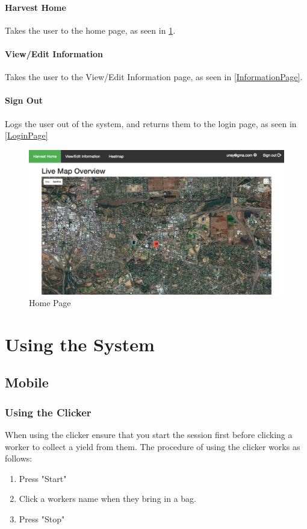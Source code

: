 \documentclass[11pt]{article}
\begin{document}
\paragraph{Harvest Home}Takes the user to the home page, as seen in \ref{HomePage}.
\paragraph{View/Edit Information}Takes the user to the View/Edit Information page, as seen in \ref{InformationPage}.
\paragraph{Sign Out}Logs the user out of the system, and returns them to the login page, as seen in \ref{LoginPage}

\begin{figure}
 \centering
 \includegraphics[width=12cm, keepaspectratio]{Images/Home-Page.png}
 \caption{Home Page}
 \label{HomePage}
\end{figure}

\newpage
\section{Using the System}

\subsection{Mobile}
\subsubsection{Using the Clicker}
When using the clicker ensure that you start the session first before clicking a worker to collect a yield from them. The procedure of using the clicker works as follows:

\begin{enumerate}
\item Press "Start"
\item Click a workers name when they bring in a bag.
\item Press "Stop"
\end{enumerate}
\end{document}
